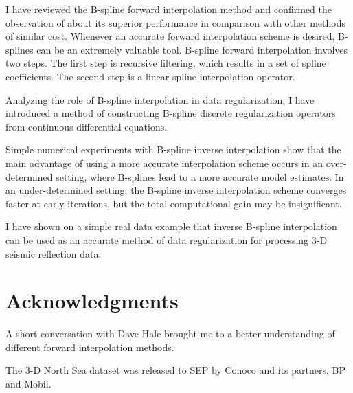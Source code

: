 I have reviewed the B-spline forward interpolation method and
confirmed the observation of  about its superior
performance in comparison with other methods of similar cost. Whenever
an accurate forward interpolation scheme is desired, B-splines can be
an extremely valuable tool. B-spline forward interpolation involves
two steps. The first step is recursive filtering, which results in a
set of spline coefficients. The second step is a linear spline
interpolation operator.
\par
Analyzing the role of B-spline interpolation in data regularization, I
have introduced a method of constructing B-spline discrete
regularization operators from continuous differential equations.
\par
Simple numerical experiments with B-spline inverse interpolation show
that the main advantage of using a more accurate interpolation scheme
occurs in an over-determined setting, where B-splines lead to a more
accurate model estimates. In an under-determined setting, the B-spline
inverse interpolation scheme converges faster at early iterations, but
the total computational gain may be insignificant.
\par
I have shown on a simple real data example that inverse B-spline
interpolation can be used as an accurate method of data regularization
for processing 3-D seismic reflection data.

\section{Acknowledgments}

A short conversation with Dave Hale brought me to a better
understanding of different forward interpolation methods.
\par
The 3-D North Sea dataset was released to SEP by Conoco and its
partners, BP and Mobil.





%
%
